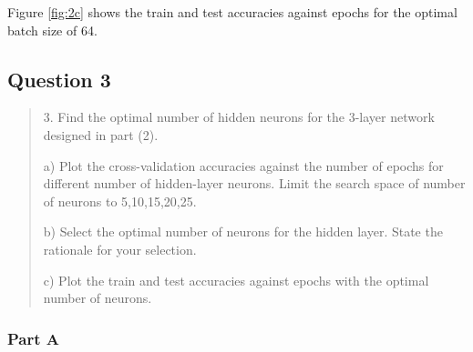 Figure \ref{fig:2c} shows the train and test accuracies against epochs for the optimal batch size of 64.

\subsection{Question 3}
\label{1q3}
\begin{quote}
3. Find the optimal number of hidden neurons for the 3-layer network designed in part (2).

a) Plot the cross-validation accuracies against the number of epochs for different number of hidden-layer neurons. Limit the search space of number of neurons to {5,10,15,20,25}.

b) Select the optimal number of neurons for the hidden layer. State the rationale for your selection.

c) Plot the train and test accuracies against epochs with the optimal number of
neurons.
\end{quote}
\subsubsection{Part A}


